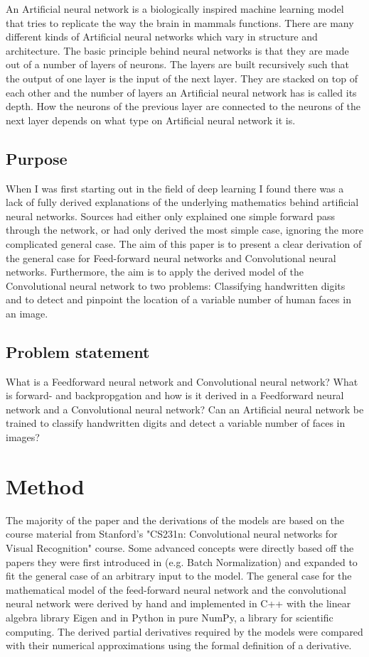 \documentclass[a4paper,11pt,twoside]{article}
\begin{document}
An Artificial neural network is a biologically inspired machine learning model that tries to replicate the way the brain in mammals functions. There are many different kinds of Artificial neural networks which vary in structure and architecture. The basic principle behind neural networks is that they are made out of a number of layers of neurons. The layers are built recursively such that the output of one layer is the input of the next layer. They are stacked on top of each other and the number of layers an Artificial neural network has is called its depth. How the neurons of the previous layer are connected to the neurons of the next layer depends on what type on Artificial neural network it is.
\cite{cs231n}

\subsection{Purpose}
When I was first starting out in the field of deep learning I found there was a lack of fully derived explanations of the underlying mathematics behind artificial neural networks. Sources had either only explained one simple forward pass through the network, or had only derived the most simple case, ignoring the more complicated general case. The aim of this paper is to present a clear derivation of the general case for Feed-forward neural networks and Convolutional neural networks. Furthermore, the aim is to apply the derived model of the Convolutional neural network to two problems: Classifying handwritten digits and to detect and pinpoint the location of a variable number of human faces in an image.

\subsection{Problem statement}
What is a Feedforward neural network and Convolutional neural network?
What is forward- and backpropgation and how is it derived in a Feedforward neural network and a Convolutional neural network?
Can an Artificial neural network be trained to classify handwritten digits and detect a variable number of faces in images?

\newpage
\section{Method}
The majority of the paper and the derivations of the models are based on the course material from Stanford's "CS231n: Convolutional neural networks for Visual Recognition" course. Some advanced concepts were directly based off the papers they were first introduced in (e.g. Batch Normalization) and expanded to fit the general case of an arbitrary input to the model. The general case for the mathematical model of the feed-forward neural network and the convolutional neural network were derived by hand and implemented in C++ with the linear algebra library Eigen and in Python in pure NumPy, a library for scientific computing. The derived partial derivatives required by the models were compared with their numerical approximations using the formal definition of a derivative. 
\end{document}
